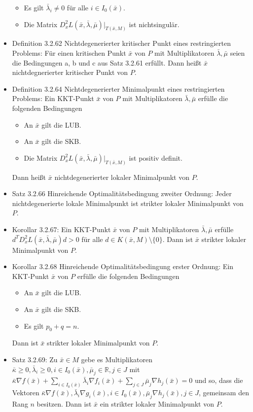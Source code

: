 \documentclass[paper=a4, fontsize=11pt]{scrartcl} %
\numberwithin{equation}{section} %
\numberwithin{figure}{section} %
\numberwithin{table}{section} %
\begin{document}
\begin{itemize}
\begin{itemize}
    \item Es gilt $\bar{\lambda}_i \neq 0$ für alle $i \in I_0(\bar{x})$.
    \item Die Matrix $D^2_x L(\bar{x},\bar{\lambda},\bar{\mu})|_{T(\bar{x},M)}$ ist nichtsingulär.
  \end{itemize}
  \item Definition 3.2.62 Nichtdegenerierter kritischer Punkt eines restringierten Problems: Für einen kritischen Punkt $\bar{x}$ von $P$ mit Multiplikatoren $\bar{\lambda}, \bar{\mu}$ seien die Bedingungen a, b und c aus Satz 3.2.61 erfüllt. Dann heißt $\bar{x}$ nichtdegnerierter kritischer Punkt von $P$.
  \item Definition 3.2.64 Nichtdegenerierter Minimalpunkt eines restringierten Problems: Ein KKT-Punkt $\bar{x}$ von $P$ mit Multiplikatoren $\bar{\lambda},\bar{\mu}$ erfülle die folgenden Bedingungen
  \begin{itemize}
    \item An $\bar{x}$ gilt die LUB.
    \item An $\bar{x}$ gilt die SKB.
    \item Die Matrix $D^2_x L(\bar{x},\bar{\lambda},\bar{\mu})|_{T(\bar{x},M)}$ ist positiv definit.
  \end{itemize}
  Dann heißt $\bar{x}$ nichtdegenerierter lokaler Minimalpunkt von $P$.
  \item Satz 3.2.66 Hinreichende Optimalitätsbedingung zweiter Ordnung: Jeder nichtdegenerierte lokale Minimalpunkt ist strikter lokaler Minimalpunkt von $P$.
  \item Korollar 3.2.67: Ein KKT-Punkt $\bar{x}$ von $P$ mit Multiplikatoren $\bar{\lambda},\bar{\mu}$ erfülle $d^TD^2_xL(\bar{x},\bar{\lambda},\bar{\mu})d > 0$ für alle $d \in K(\bar{x},M) \setminus \{ 0 \}$. Dann ist $\bar{x}$ strikter lokaler Minimalpunkt von $P$.
  \item Korollar 3.2.68 Hinreichende Optimalitätsbedingung erster Ordnung: Ein KKT-Punkt $\bar{x}$ von $P$ erfülle die folgenden Bedingungen
  \begin{itemize}
    \item An $\bar{x}$ gilt die LUB.
    \item An $\bar{x}$ gilt die SKB.
    \item Es gilt $p_0 + q = n$.
  \end{itemize}
  Dann ist $\bar{x}$ strikter lokaler Minimalpunkt von $P$.
  \item Satz 3.2.69: Zu $\bar{x} \in M$ gebe es Multiplikatoren $\bar{\kappa} \ge 0, \bar{\lambda}_i \ge 0, i \in I_0(\bar{x}), \bar{\mu}_j \in \mathbb{R}, j \in J$ mit $\bar{\kappa} \nabla f(\bar{x}) + \sum\limits_{i \in I_0(\bar{x})} \bar{\lambda}_i \nabla f_i(\bar{x}) + \sum\limits_{j \in J} \bar{\mu}_j \nabla h_j(\bar{x}) = 0$ und so, dass die Vektoren $\bar{\kappa} \nabla f(\bar{x}), \bar{\lambda}_i \nabla g_i(\bar{x}), i \in I_0(\bar{x}), \bar{\mu}_j \nabla h_j(\bar{x}), j \in J$, gemeinsam den Rang $n$ besitzen. Dann ist $\bar{x}$ ein strikter lokaler Minimalpunkt von $P$.

\end{itemize}
\end{document}
